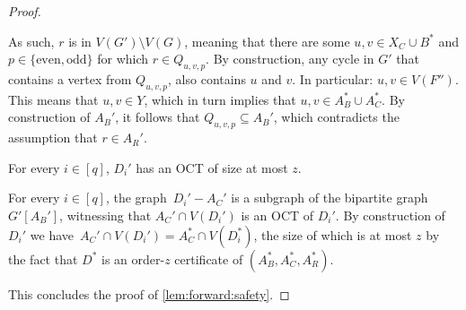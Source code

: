 \begin{proof}
\begin{claimproof}
		As such, $r$ is in $V(G') \setminus V(G)$, meaning that there are some $u, v \in X_C \cup B^\ast$ and $p \in \{\text{even}, \text{odd}\}$ for which $r \in Q_{u, v, p}$.		
		By construction, any cycle in $G'$ that contains a vertex from $Q_{u,v,p}$, also contains $u$ and $v$. In particular: $u, v \in V(F'')$. This means that $u, v \in Y$, which in turn implies that $u, v \in A_B^\ast \cup A_C^\ast$. By construction of $A_B'$, it follows that $Q_{u, v, p} \subseteq A_B'$, which contradicts the assumption that $r \in A_R'$.
	\end{claimproof}
	
	\begin{claim}
		For every $i \in [q]$, $D_i'$ has an OCT of size at most $z$.
	\end{claim}
	\begin{claimproof}
		For every $i \in [q]$, the graph~$D_i' - A_C'$ is a subgraph of the bipartite graph $G'[A_B']$, witnessing that $A_C' \cap V(D_i')$ is an OCT of $D_i'$. By construction of $D_i'$ we have~$A_C' \cap V(D_i') = A_C^\ast \cap V(D_i^\ast)$, the size of which is at most $z$ by the fact that $D^\ast$ is an order-$z$ certificate of $(A_B^\ast, A_C^\ast, A_R^\ast)$. 
	\end{claimproof}
	This concludes the proof of \cref{lem:forward:safety}.
\end{proof}

%
%
%
%
%

